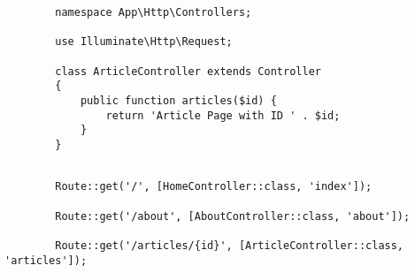 \documentclass[12pt,titlepage]{article}
\begin{document}
\begin{enumerate}[label=\alph*.]
\begin{verbatim}
        namespace App\Http\Controllers;
        
        use Illuminate\Http\Request;
        
        class ArticleController extends Controller
        {
            public function articles($id) {
                return 'Article Page with ID ' . $id;
            }
        }
        
    \end{verbatim}
    \begin{verbatim}
        Route::get('/', [HomeController::class, 'index']);

        Route::get('/about', [AboutController::class, 'about']); 

        Route::get('/articles/{id}', [ArticleController::class, 'articles']);

    \end{verbatim}
\end{enumerate}
\end{document}
